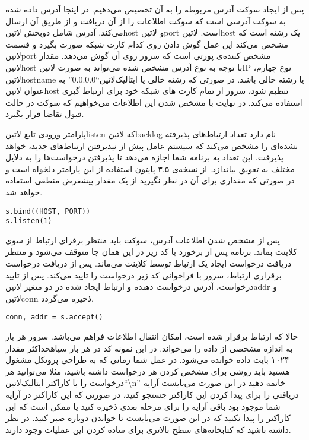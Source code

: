 \documentclass[]{article}
\begin{document}
  پس از ایجاد سوکت‌ آدرس مربوطه را به آن تخصیص می‌دهیم.
  در اینجا آدرس داده شده به سوکت‌ آدرسی‌ است که سوکت اطلاعات را از آن دریافت و از طریق آن ارسال می‌کند.
  آدرس شامل دوبخش ‌لاتین{host} و ‌لاتین{port} است.
  ‌لاتین{host} یک رشته است که مشخص می‌کند این عمل گوش دادن روی کدام کارت شبکه صورت بگیرد و قسمت ‌لاتین{port} مشخص کننده‌ی پورتی است که سرور روی آن گوش می‌دهد.
  مقدار ‌لاتین{host} با توجه به نوع آدرس مشخص شده می‌تواند به صورت ‌لاتین{IP} نوع چهارم،  ‌لاتین{hostname} یا رشته خالی باشد.
  در صورتی که رشته خالی یا ‌ایتالیک{‌لاتین{``0.0.0.0''}} به عنوان ‌لاتین{host} تنظیم شود،
  سرور از تمام کارت های شبکه خود برای ارتباط گیری استفاده می‌کند.
  در نهایت با مشخص شدن این اطلاعات می‌خواهیم که سوکت در حالت قبول تقاضا قرار بگیرد.

  پارامتر ورودی تابع ‌لاتین{listen} که ‌لاتین{backlog} نام دارد تعداد ارتباط‌های پذیرفته نشده‌ای را مشخص می‌کند که سیستم عامل
  پیش از نپذیرفتن ارتباط‌های جدید، خواهد پذیرفت. این تعداد به برنامه شما اجازه می‌دهد تا پذیرفتن درخواست‌ها را به دلایل مختلف به تعویق بیاندازد.
  از نسخه‌ی ۳.۵ پایتون استفاده از این پارامتر دلخواه است و در صورتی که مقداری برای آن در نظر نگیرید از یک مقدار پیشفرض منطقی استفاده خواهد شد.

  \begin{latin}
  \begin{verbatim}
s.bind((HOST, PORT))
s.listen(1)
  \end{verbatim}
  \end{latin}

  پس از مشخص شدن اطلاعات آدرس، سوکت باید منتظر برقرای ارتباط از سوی کلاینت بماند.
  برنامه پس از برخورد با کد زیر در این همان جا متوقف می‌شود و منتظر دریافت درخواست ایجاد یک ارتباط توسط کلاینت می‌ماند.
  پس از دریافت درخواست برقراری ارتباط، سرور با فراخوانی کد زیر درخواست را تایید می‌کند.
  پس از تایید درخواست، آدرس درخواست دهنده و ارتباط ایجاد شده در دو متغیر ‌لاتین{addr} و ‌لاتین{conn} ذخیره می‌گردد.

  \begin{latin}
  \begin{verbatim}
conn, addr = s.accept()
  \end{verbatim}
  \end{latin}

  حالا که ارتباط برقرار شده است، امکان انتقال اطلاعات فراهم می‌باشد.
  سرور هر بار به اندازه مشخصی از داده را می‌خواند. در این نمونه کد در هر بار ‌سیاه{حداکثر} مقدار ۱۰۲۴ بایت داده خوانده می‌شود.
  در عمل شما زمانی که به طراحی پروتکل مشغول هستید باید روشی برای مشخص کردن هر درخواست داشته باشید، مثلا می‌توانید هر درخواست
  را با کاراکتر ‌ایتالیک{‌لاتین{``\textbackslash n''}} خاتمه دهید در این صورت می‌بایست آرایه دریافتی را برای پیدا کردن این کاراکتر جستجو کنید،
  در صورتی که این کاراکتر در آرایه شما موجود بود باقی آرایه را برای مرحله بعدی ذخیره کنید یا ممکن است که این کاراکتر را پیدا نکنید که
  در این صورت می‌بایست تا خواندن دوباره صبر کنید. در نظر داشته باشید که کتابخانه‌های سطح بالاتری برای ساده کردن این عملیات وجود دارند.
\end{document}
